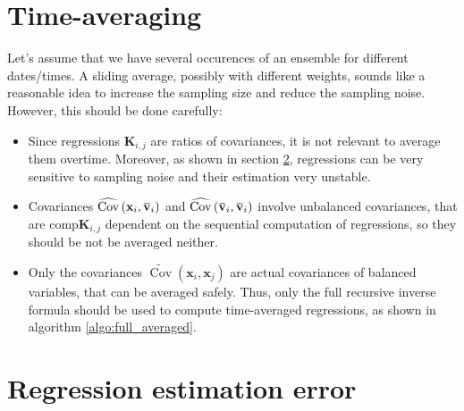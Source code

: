 \documentclass[12pt]{scrartcl}
\newcommand{\overbar}[1]{\mkern 1.5mu\overline{\mkern-1.5mu#1\mkern-1.5mu}\mkern 1.5mu}
\DeclareMathOperator{\Cov}{Cov}
\begin{document}
\section{Time-averaging}

Let's assume that we have several occurences of an ensemble for different dates/times. A sliding average, possibly with different weights, sounds like a reasonable idea to increase the sampling size and reduce the sampling noise. However, this should be done carefully:
\begin{itemize}
\item Since regressions $\mathbf{K}_{i,j}$ are ratios of covariances, it is not relevant to average them overtime. Moreover, as shown in section \ref{sec:noise}, regressions can be very sensitive to sampling noise and their estimation very unstable.
\item Covariances $\widehat{\Cov}\left(\mathbf{x}_i, \overbar{\mathbf{v}}_i\right)$ and $\widehat{\Cov}\left(\overbar{\mathbf{v}}_i, \overbar{\mathbf{v}}_i\right)$ involve unbalanced covariances, that are comp$\mathbf{K}_{i,j}$ dependent on the sequential computation of regressions, so they should be not be averaged neither.
\item Only the covariances $\widetilde{\Cov}\left(\mathbf{x}_i, \mathbf{x}_j\right)$ are actual covariances of balanced variables, that can be averaged safely. Thus, only the full recursive inverse formula should be used to compute time-averaged regressions, as shown in algorithm \ref{algo:full_averaged}.
\end{itemize}

\section{Regression estimation error}
\label{sec:noise}
\end{document}
